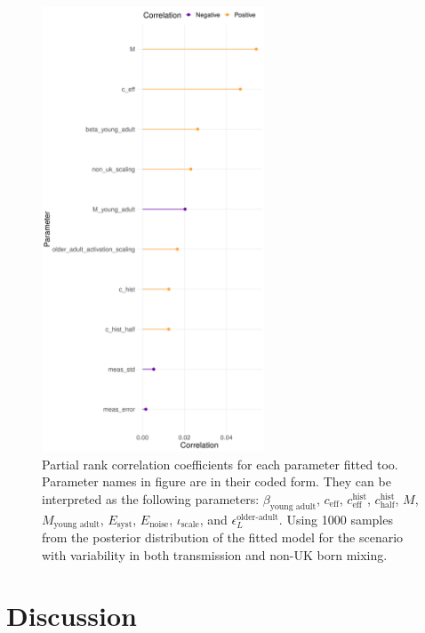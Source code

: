 \documentclass[11pt,twoside]{bristolthesis}
\begin{document}
  \newpage
  \begin{figure}
  
  {\centering \includegraphics[width=250px]{chapters/model-fitting/plots/incidence-sensitivity-1} 
  
  }
  
  \caption[Partial rank correlation coefficients for each parameter fitted too.]{Partial rank correlation coefficients for each parameter fitted too. Parameter names in figure are in their coded form. They can be interpreted as the following parameters:  $\beta_{\text{young adult}}$, $c_{\text{eff}}$, $c^{\text{hist}}_{\text{eff}}$, $c^{\text{hist}}_{\text{half}}$, $M$, $M_{\text{young adult}}$, $E_{\text{syst}}$, $E_{\text{noise}}$, $\iota_{\text{scale}}$, and $\epsilon^{\text{older-adult}}_L$. Using 1000 samples from the posterior distribution of the fitted model for the scenario with variability in both transmission and non-UK born mixing.}\label{fig:09-fig-sens}
  \end{figure}
  \newpage
  
  \hypertarget{discussion-6}{%
  \section{Discussion}\label{discussion-6}}
  
\end{document}
